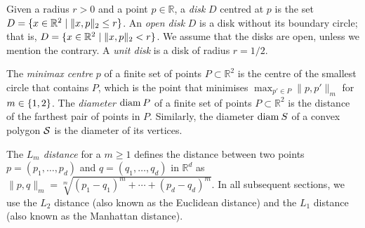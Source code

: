 \begin{toappendix}
    Given a radius $r>0$ and a point $p\in \mathbb{R}$, a \emph{disk} $D$ centred at $p$ is the set $D = \set{x\in \mathbb{R}^2\mid \lVert x,p \rVert_2 \le r}$.
    An \emph{open disk} $D$ is a disk without its boundary circle; that is, $D = \set{x\in \mathbb{R}^2\mid \lVert x,p \rVert_2 < r}$.
    We assume that the disks are open, unless we mention the contrary.
    A \emph{unit disk} is a disk of radius $r = 1/2$.
    \begin{toappendix}
    The \emph{minimax centre} $p$ of a finite set of points $P \subset \mathbb{R}^2$ is the centre of the smallest circle that contains $P$, which is the point that minimises $\max_{p'\in P} \lVert p,p'\rVert_m$ for $m \in \set{1,2}$.
    The \emph{diameter} $\diam{P}$ of a finite set of points $P \subset \mathbb{R}^2$ is the distance of the farthest pair of points in $P$.
    Similarly, the diameter $\diam{S}$ of a convex polygon $\S$ is the diameter of its vertices.
    \end{toappendix}
    The \emph{$L_m$ distance} for a $m\ge 1$ defines the distance between two points $p = (p_1,\ldots,p_d)$ and $q = (q_1,\ldots,q_d)$ in $\mathbb{R}^d$ as $\lVert p,q\rVert_m = \sqrt[m]{(p_1-q_1)^m+\cdots + (p_d - q_d)^m}$.
    In all subsequent sections, we use the $L_2$ distance (also known as the Euclidean distance) and the $L_1$ distance (also known as the Manhattan distance).


\end{toappendix}
